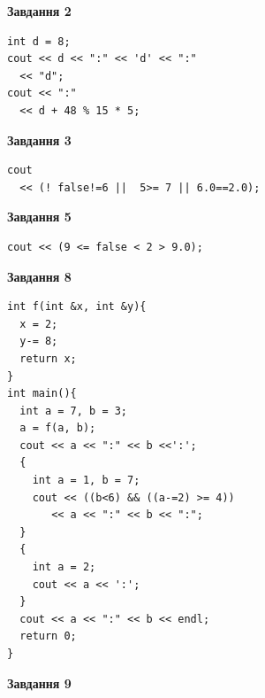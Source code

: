 \documentclass[12pt, ukrainian]{article}
\begin{document}
{\begin {large}
\begin{minipage}[t]{7.0cm}
\end{minipage}
\vline \hspace{1mm}
\begin{minipage}[t]{11.0cm}

\begin{center}
\textbf{Завдання 2}
\end{center}
\vspace{-8mm}

\begin{verbatim}
int d = 8;
cout << d << ":" << 'd' << ":" 
  << "d";
cout << ":" 
  << d + 48 % 15 * 5;
\end{verbatim}



\begin{center}
\textbf{Завдання 3}
\end{center}
\vspace{-8mm}

\begin{verbatim}
cout 
  << (! false!=6 ||  5>= 7 || 6.0==2.0);
\end{verbatim}



\begin{center}
\textbf{Завдання 5}
\end{center}
\vspace{-8mm}

\begin{verbatim}
cout << (9 <= false < 2 > 9.0);
\end{verbatim}



\begin{center}
\textbf{Завдання 8}
\end{center}
\vspace{-8mm}

\begin{verbatim}
int f(int &x, int &y){
  x = 2;
  y-= 8;
  return x;
}
int main(){
  int a = 7, b = 3;
  a = f(a, b);
  cout << a << ":" << b <<':';
  {
    int a = 1, b = 7;
    cout << ((b<6) && ((a-=2) >= 4))
       << a << ":" << b << ":";
  }
  {
    int a = 2;
    cout << a << ':';
  }
  cout << a << ":" << b << endl;
  return 0;
}
\end{verbatim}

\end{minipage}


\begin{minipage}[t]{7.0cm}

\begin{center}
\textbf{Завдання 9}
\end{center}
\vspace{-8mm}


\end{minipage}
\end{large}}
\end{document}
